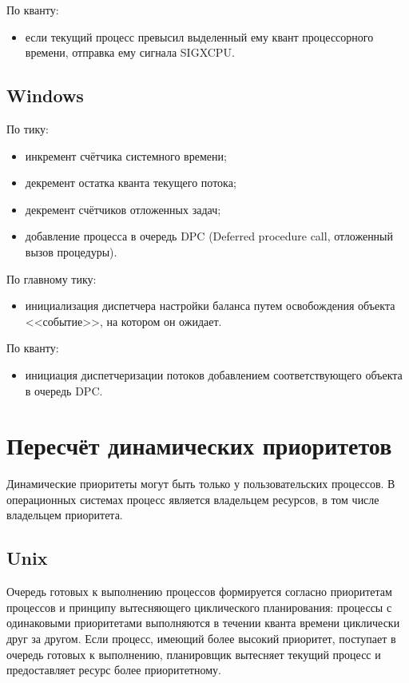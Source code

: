По кванту:
\begin{itemize}
	\item если текущий процесс превысил выделенный ему квант процессорного времени, отправка ему сигнала SIGXCPU.
\end{itemize}

\section{Windows}

По тику:
\begin{itemize}
	\item инкремент счётчика системного времени;
	\item декремент остатка кванта текущего потока;
	\item декремент счётчиков отложенных задач;
	\item добавление процесса в очередь DPC (Deferred procedure call, отложенный вызов процедуры). 
\end{itemize}

По главному тику: 
\begin{itemize}
	\item инициализация диспетчера настройки баланса путем освобождения объекта <<событие>>, на котором он ожидает.
\end{itemize}

По кванту:
\begin{itemize}
	\item инициация диспетчеризации потоков добавлением соответствующего объекта в очередь DPC.
\end{itemize}

\chapter{Пересчёт динамических приоритетов}

Динамические приоритеты могут быть только у пользовательских процессов. В операционных системах процесс является владельцем ресурсов, в том числе владельцем приоритета.

\section{Unix}

Очередь готовых к выполнению процессов формируется согласно приоритетам процессов и принципу вытесняющего циклического планирования: процессы с одинаковыми приоритетами выполняются в течении кванта времени циклически друг за другом. Если процесс, имеющий более высокий приоритет, поступает в очередь готовых к выполнению, планировщик вытесняет текущий процесс и предоставляет ресурс более приоритетному. 

